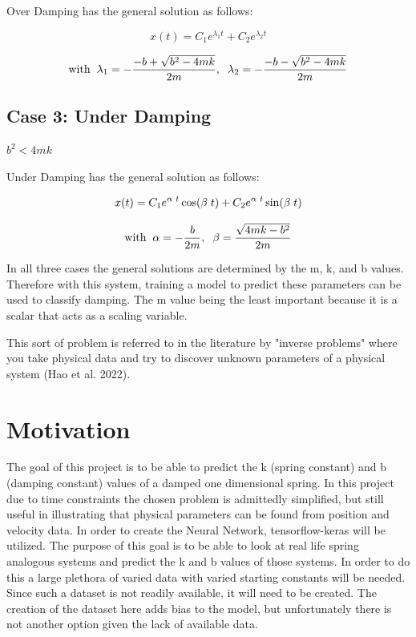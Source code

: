 \documentclass[12pt]{article}
\begin{document}
	Over Damping has the general solution as follows:

	$$ x(t) =  C_1e^{\lambda_1t} +C_2e^{\lambda_2t} $$

	$$ \text{with}\hspace{2mm} \lambda_1 = -\dfrac{-b + \sqrt{b^2-4mk}}{2m}, \hspace{2mm} \lambda_2 = -\dfrac{-b - \sqrt{b^2-4mk}}{2m} $$

	\subsection*{Case 3: Under Damping}
	$b^2 < 4mk$

	Under Damping has the general solution as follows:

	$$x(t) = C_1e^{\alpha \hspace{1mm} t}\cos(\beta \hspace{1mm} t)+C_2e^{\alpha \hspace{1mm} t}\sin(\beta \hspace{1mm} t)$$

	$$ \text{with}\hspace{2mm} \alpha = -\dfrac{b}{2m}, \hspace{2mm} \beta = \dfrac{\sqrt{4mk-b^2}}{2m}$$


	In all three cases the general solutions are determined by the m, k, and b values. Therefore with this system, training a model to predict these parameters can be used to classify damping. The m value being the least important because it is a scalar that acts as a scaling variable.

	This sort of problem is referred to in the literature by "inverse problems" where you take physical data and try to discover unknown parameters of a physical system (Hao et al. 2022).

	\section*{Motivation}

	The goal of this project is to be able to predict the k (spring constant) and b (damping constant) values of a damped one dimensional spring. In this project due to time constraints the chosen problem is admittedly simplified, but still useful in illustrating that physical parameters can be found from position and velocity data. In order to create the Neural Network, tensorflow-keras will be utilized. The purpose of this goal is to be able to look at real life spring analogous systems and predict the k and b values of those systems. In order to do this a large plethora of varied data with varied starting constants will be needed. Since such a dataset is not readily available, it will need to be created. The creation of the dataset here adds bias to the model, but unfortunately there is not another option given the lack of available data.
\end{document}
